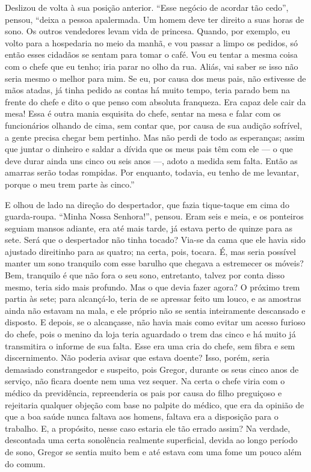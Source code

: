 Deslizou de volta à sua posição anterior. “Esse negócio de acordar tão
cedo”, pensou, “deixa a pessoa apalermada. Um homem deve ter direito a
suas horas de sono. Os outros vendedores levam vida de princesa. Quando,
por exemplo, eu volto para a hospedaria no meio da manhã, e vou passar a
limpo os pedidos, só então esses cidadãos se sentam para tomar o café. Vou
eu tentar a mesma coisa com o chefe que eu tenho; iria parar no olho da
rua. Aliás, vai saber se isso não seria mesmo o melhor para mim. Se eu,
por causa dos meus pais, não estivesse de mãos atadas, já tinha pedido as
contas há muito tempo, teria parado bem na frente do chefe e dito o que
penso com absoluta franqueza. Era capaz dele cair da mesa! Essa é outra
mania esquisita do chefe, sentar na mesa e falar com os funcionários
olhando de cima, sem contar que, por causa de sua audição sofrível, a
gente precisa chegar bem pertinho. Mas não perdi de todo as esperanças;
assim que juntar o dinheiro e saldar a dívida que os meus pais têm com ele
--- o que deve durar ainda uns cinco ou seis anos ---, adoto a medida sem
falta. Então as amarras serão todas rompidas. Por enquanto, todavia, eu
tenho de me levantar, porque o meu trem parte às cinco.”

E olhou de lado na direção do despertador, que fazia tique-taque em cima
do guarda-roupa. “Minha Nossa Senhora!”, pensou. Eram seis e meia, e os
ponteiros seguiam mansos adiante, era até mais tarde, já estava perto de
quinze para as sete.
Será que o despertador não tinha tocado? Via-se da cama
que ele havia sido ajustado direitinho para as quatro; na certa, pois,
tocara. É, mas seria possível manter um sono tranquilo com esse barulho
que chegava a estremecer os móveis? Bem, tranquilo é que não fora o seu
sono, entretanto, talvez por conta disso mesmo, teria sido mais profundo.
Mas o que devia fazer agora? O próximo trem partia às sete; para
alcançá-lo, teria de se apressar feito um louco, e as amostras ainda não
estavam na mala, e ele próprio não se sentia inteiramente descansado e
disposto. E depois, se o alcançasse, não havia mais como evitar um
acesso furioso do chefe, pois o menino da loja teria aguardado o trem das
cinco e há muito já transmitira o informe de sua falta. Esse era uma cria
do chefe, sem fibra e sem discernimento. Não poderia avisar que estava
doente? Isso, porém, seria demasiado constrangedor e suspeito, pois
Gregor, durante os seus cinco anos de serviço, não ficara doente nem uma
vez sequer. Na certa o chefe viria com o médico da previdência,
repreenderia os pais por causa do filho preguiçoso e rejeitaria qualquer
objeção com base no palpite do médico, que era da opinião de que a boa
saúde nunca faltava aos homens, faltava era a disposição para o trabalho.
E, a propósito, nesse caso estaria ele tão errado assim? Na verdade,
descontada uma certa sonolência realmente superficial, devida ao longo
período de sono, Gregor se sentia muito bem e até estava com uma fome um
pouco além do comum.

